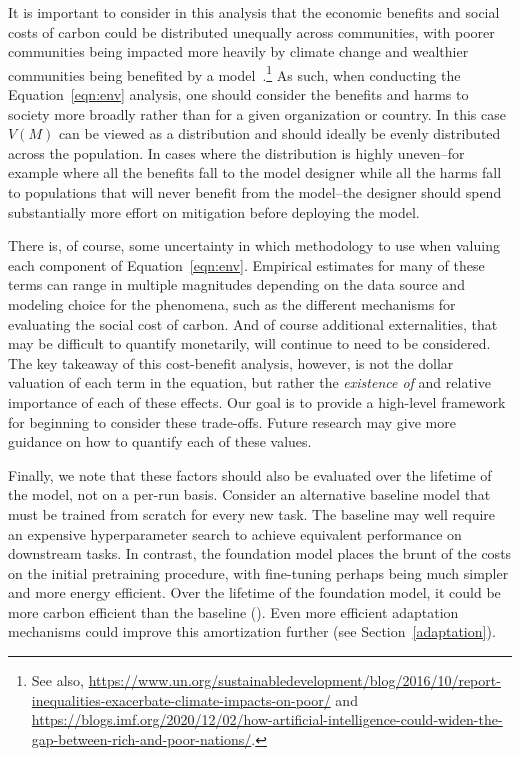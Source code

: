 It is important to consider in this analysis that the economic benefits and social costs of carbon could be distributed unequally across communities, with poorer communities being impacted more heavily by climate change and wealthier communities being benefited by a model~\citep{bender2021}.\footnote{See also, \url{https://www.un.org/sustainabledevelopment/blog/2016/10/report-inequalities-exacerbate-climate-impacts-on-poor/} and \url{https://blogs.imf.org/2020/12/02/how-artificial-intelligence-could-widen-the-gap-between-rich-and-poor-nations/}.} As such, when conducting the Equation~\ref{eqn:env}  analysis, one should consider the benefits and harms to society more broadly rather than for a given organization or country. In this case $V(M)$ can be viewed as a distribution and should ideally be evenly distributed across the population. In cases where the distribution is highly uneven--for example where all the benefits fall to the model designer while all the harms fall to populations that will never benefit from the model--the designer should spend substantially more effort on mitigation before deploying the model. 

There is, of course, some uncertainty in which methodology to use when valuing each component of Equation~\ref{eqn:env}. 
Empirical estimates for many of these terms can range in multiple magnitudes depending on the data source and modeling choice for the phenomena, such as the different mechanisms for evaluating the social cost of carbon. And of course additional externalities, that may be difficult to quantify monetarily, will continue to need to be considered. The key takeaway of this cost-benefit analysis, however, is not the dollar valuation of each term in the equation, but rather the \emph{existence of} and relative importance of each of these effects. Our goal is to provide a high-level framework for beginning to consider these trade-offs. Future research may give more guidance on how to quantify each of these values. 

Finally, we note that these factors should also be evaluated over the lifetime of the model, not on a per-run basis. Consider an alternative baseline model that must be trained from scratch for every new task. The baseline may well require an expensive hyperparameter search to achieve equivalent performance on downstream tasks. In contrast, the foundation model places the brunt of the costs on the initial pretraining procedure, with fine-tuning perhaps being much simpler and more energy efficient. Over the lifetime of the foundation model, it could be more carbon efficient than the baseline  (). 
Even more efficient adaptation mechanisms could improve this amortization further (see Section~\ref{adaptation}).

